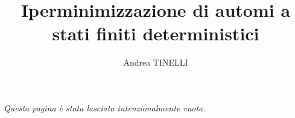 \documentclass[a4paper,12pt]{report} %
\begin{document}


\title{Iperminimizzazione di automi a stati finiti deterministici}
\author{Andrea TINELLI}



\beforepreface
\prefacesection{}
{\hfill {\sl Questa pagina è stata lasciata intenzionalmente vuota.}}


\end{document}

